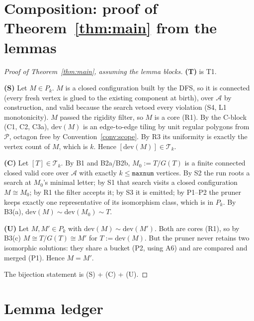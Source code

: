 \documentclass[11pt]{article}
\theoremstyle{definition}
\newcommand{\dev}{\mathrm{dev}}
\newcommand{\A}{\mathcal{A}}
\newcommand{\T}{\mathcal{T}}
\begin{document}
\section{Composition: proof of Theorem~\ref{thm:main} from the lemmas}\label{sec:compose}

\begin{proof}[Proof of Theorem~\ref{thm:main}, assuming the lemma blocks]
\textbf{(T)} is T1.

\textbf{(S)} Let $M \in P_k$. $M$ is a closed configuration built by the DFS, so it is
connected (every fresh vertex is glued to the existing component at birth), over $\A$ by
construction, and valid because the search vetoed every violation (S4, L1 monotonicity).
$M$ passed the rigidity filter, so $M$ is a core (R1). By the C-block (C1, C2, C3a),
$\dev(M)$ is an edge-to-edge tiling by unit regular polygons from $\mathcal{P}$, octagon
free by Convention~\ref{conv:scope}. By R3 its uniformity is exactly the vertex count of
$M$, which is $k$. Hence $[\dev(M)] \in \T_k$.

\textbf{(C)} Let $[T] \in \T_k$. By B1 and B2a/B2b, $M_0 := T/G(T)$ is a finite connected
closed valid core over $\A$ with exactly $k \le \texttt{maxnum}$ vertices. By S2 the run
roots a search at $M_0$'s minimal letter; by S1 that search visits a closed configuration
$M \cong M_0$; by R1 the filter accepts it; by S3 it is emitted; by P1--P2 the pruner
keeps exactly one representative of its isomorphism class, which is in $P_k$. By B3(a),
$\dev(M) \sim \dev(M_0) \sim T$.

\textbf{(U)} Let $M, M' \in P_k$ with $\dev(M) \sim \dev(M')$. Both are cores (R1), so by
B3(c) $M \cong T/G(T) \cong M'$ for $T := \dev(M)$. But the pruner never retains two
isomorphic solutions: they share a bucket (P2, using A6) and are compared and merged
(P1). Hence $M = M'$.

The bijection statement is (S) + (C) + (U).
\end{proof}

\section{Lemma ledger}\label{sec:ledger}
\end{document}
